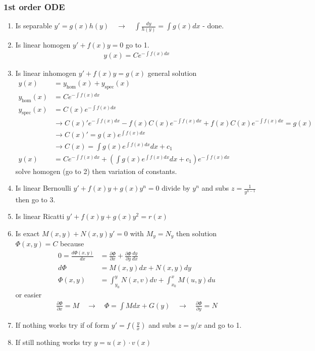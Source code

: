 \documentclass[10pt,a4paper]{article}
\theoremstyle{definition}
\begin{document}
\newpage
\subsubsection{1st order ODE}
\begin{enumerate}
\item Is separable $y'=g(x)h(y)\quad\rightarrow\quad \int\frac{dy}{h(y)}=\int g(x)dx$ - done.
\item Is linear homogen $y'+f(x)y=0$ go to 1.
\begin{align}
y(x)=Ce^{-\int f(x)dx}
\end{align}
\item Is linear inhomogen $y'+f(x)y=g(x)$ general solution
\begin{align}
y(x)&=y_\text{hom}(x)+y_\text{spec}(x)\\
y_\text{hom}(x)&=Ce^{-\int f(x)dx}\\
y_\text{spec}(x)&=C(x)e^{-\int f(x)dx}\\
&\rightarrow C(x)'e^{-\int f(x)dx}-f(x)C(x)e^{-\int f(x)dx}+f(x)C(x)e^{-\int f(x)dx}=g(x)\\
&\rightarrow C(x)'=g(x)e^{\int f(x)dx}\\
&\rightarrow C(x)=\int g(x)e^{\int f(x)dx}dx+c_1\\
y(x)&=Ce^{-\int f(x)dx}+\left(\int g(x)e^{\int f(x)dx}dx+c_1\right)e^{-\int f(x)dx}
\end{align}
solve homogen (go to 2) then variation of constants.
\item Is linear Bernoulli $y'+f(x)y+g(x)y^n=0$ divide by $y^n$ and subs $z=\frac{1}{y^{n-1}}$ then go to 3.
\item Is linear Ricatti $y'+f(x)y+g(x)y^2=r(x)$
\item Is exact $M(x,y)+N(x,y)y'=0$ with $M_y=N_y$ then solution $\Phi(x,y)=C$ because
\begin{align}
0=\frac{d\Phi(x,y)}{dx}&=\frac{\partial\Phi}{\partial x}+\frac{\partial\Phi}{\partial y}\frac{dy}{dx}\\
d\Phi&=M(x,y)dx+N(x,y)dy\\
\Phi(x,y)&=\int_{y_0}^yN(x,v)dv+\int_{x_0}^xM(u,y)du
\end{align}
or easier
\begin{align}
\frac{\partial\Phi}{\partial x}=M\quad\rightarrow\quad\Phi=\int M dx+G(y)\quad\rightarrow\quad\frac{\partial\Phi}{\partial y}=N
\end{align}
\item If nothing works try if of form $y'=f\left(\frac{y}{x}\right)$ and subs $z=y/x$ and go to 1.

\item If still nothing works try $y=u(x)\cdot v(x)$
\end{enumerate}
\end{document}
